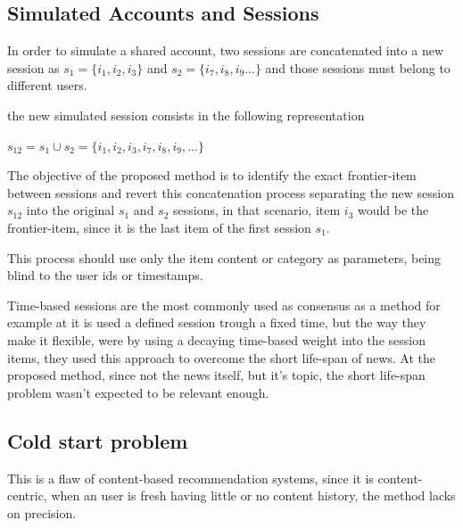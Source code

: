 \documentclass[ecp,tc,english]{iiufrgs}
\begin{document}
        \subsection{Simulated Accounts and Sessions}
        In order to simulate a shared account, two sessions are concatenated into a new session as \(s_{1} = \{i_{1}, i_{2}, i_{3}\}\) and  \(s_{2} = \{i_{7}, i_{8}, i_{9} ...\}\) and those sessions must belong to different users.
    
        the new simulated session consists in the following representation
    
        \(s_{12} =  s_{1} \cup  s_{2} =  \{i_{1}, i_{2}, i_{3}, i_{7}, i_{8}, i_{9}, ...\}\)
    
        The objective of the proposed method is to identify the exact frontier-item between sessions and revert this concatenation process separating the new session  \(s_{12}\) into the original \(s_{1}\) and \(s_{2}\) sessions, in that scenario, item \(i_{3}\) would be the frontier-item, since it is the last item of the first session \(s_{1}\).
    
        This process should use only the item content or category as parameters, being blind to the user ids or timestamps.    
        
        
        
        Time-based sessions are the most commonly used as consensus as a method for example at \cite{10.1145/3184558.3191582} it is used a defined session trough a fixed time, but the way they make it flexible, were by using a decaying time-based weight into the session items, they used this approach to overcome the short life-span of news. At the proposed method, since not the news itself, but it's topic, the short life-span problem wasn't expected to be relevant enough.
    
        \subsection{Cold start problem}
        This is a flaw of content-based recommendation systems, since it is content-centric, when an user is fresh having little or no content history, the method lacks on precision. 
    
\end{document}
